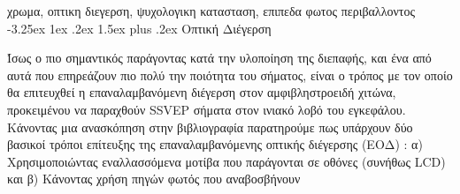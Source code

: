 \documentclass[11pt,a4paper,english,greek,twoside]{../Thesis}
\makeatletter
\renewcommand\paragraph{\@startsection{paragraph}{4}{\z@}%
                                    {-3.25ex \@plus1ex \@minus.2ex}%
                                    {1.5ex plus .2ex}%
                                    {\normalfont\normalsize\bfseries}}
\makeatother
\begin{document}
    
      
        χρωμα, οπτικη διεγερση, ψυχολογικη κατασταση, επιπεδα φωτος περιβαλλοντος
      \paragraph{Οπτική Διέγερση} ~\\
      \label{subsec:visual_stimulus}  
      \par Ίσως ο πιο σημαντικός παράγοντας κατά την υλοποίηση της διεπαφής, και ένα από αυτά που επηρεάζουν πιο πολύ την ποιότητα του σήματος,  είναι ο τρόπος με τον οποίο θα επιτευχθεί η επαναλαμβανόμενη διέγερση στον αμφιβληστροειδή χιτώνα, προκειμένου να παραχθούν SSVEP σήματα στον ινιακό λοβό του εγκεφάλου. Κάνοντας μια ανασκόπηση στην βιβλιογραφία παρατηρούμε πως υπάρχουν δύο βασικοί τρόποι επίτευξης της επαναλαμβανόμενης οπτικής διέγερσης (ΕΟΔ) : α) Χρησιμοποιώντας εναλλασσόμενα μοτίβα που παράγονται σε οθόνες (συνήθως LCD) και β) Κάνοντας χρήση πηγών φωτός που αναβοσβήνουν
    
    
\end{document}
